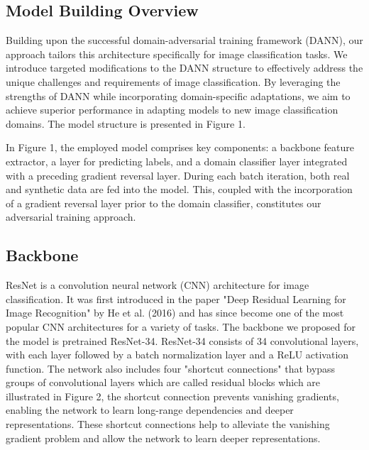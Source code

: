 \documentclass[sigconf,authordraft]{acmart}
\begin{document}
\subsection{Model Building Overview}
Building upon the successful domain-adversarial training framework (DANN), our approach tailors this architecture specifically for image classification tasks. We introduce targeted modifications to the DANN structure to effectively address the unique challenges and requirements of image classification. By leveraging the strengths of DANN while incorporating domain-specific adaptations, we aim to achieve superior performance in adapting models to new image classification domains. The model structure is presented in Figure 1.

\noindent In Figure 1, the employed model comprises key components: a backbone feature extractor, a layer for predicting labels, and a domain classifier layer integrated with a preceding gradient reversal layer. During each batch iteration, both real and synthetic data are fed into the model. This, coupled with the incorporation of a gradient reversal layer prior to the domain classifier, constitutes our adversarial training approach.
\subsection{Backbone}
ResNet is a convolution neural network (CNN) architecture for image classification. It was first introduced in the paper "Deep Residual Learning for Image Recognition" by He et al. (2016)\cite{20} and has since become one of the most popular CNN architectures for a variety of tasks. The backbone we proposed for the model is pretrained ResNet-34. ResNet-34 consists of 34 convolutional layers, with each layer followed by a batch normalization layer and a ReLU activation function. The network also includes four "shortcut connections" that bypass groups of convolutional layers which are called residual blocks which are illustrated in Figure 2, the shortcut connection prevents vanishing gradients, enabling the network to learn long-range dependencies and deeper representations. These shortcut connections help to alleviate the vanishing gradient problem and allow the network to learn deeper representations. 
\end{document}
